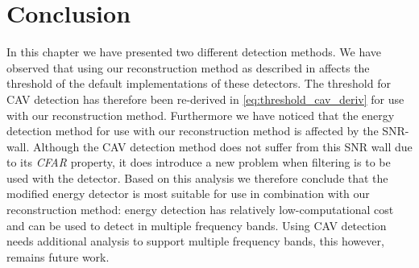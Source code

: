 \documentclass[a4paper, openany, oneside]{memoir}
\begin{document}
\section{Conclusion}
In this chapter we have presented two different detection methods. We have observed that using our reconstruction method as described in  affects the threshold of the default implementations of these detectors. The threshold for CAV detection has therefore been re-derived in \cref{eq:threshold_cav_deriv} for use with our reconstruction method. Furthermore we have noticed that the energy detection method for use with our reconstruction method is affected by the SNR-wall. Although the CAV detection method does not suffer from this SNR wall due to its \emph{CFAR} property, it does introduce a new problem when filtering is to be used with the detector. Based on this analysis we therefore conclude that the modified energy detector is most suitable for use in combination with our reconstruction method: energy detection  has relatively low-computational cost and can be used to detect in multiple frequency bands.  Using CAV detection needs additional analysis to support multiple frequency bands, this however, remains future work.
\end{document}

